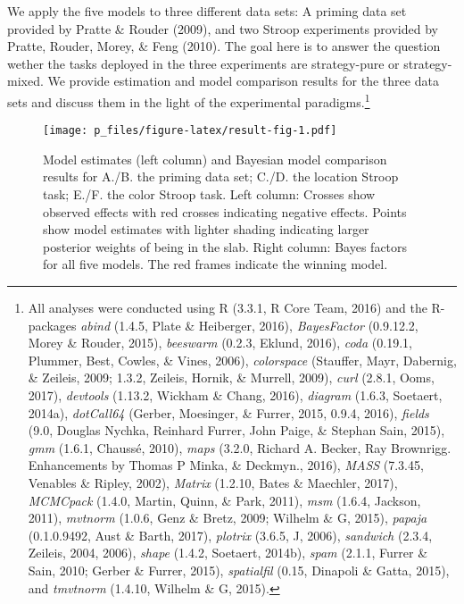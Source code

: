 \documentclass[english,man]{apa6}
\theoremstyle{definition}
\theoremstyle{definition}
\theoremstyle{remark}
\begin{document}
We apply the five models to three different data sets: A priming data
set provided by Pratte \& Rouder (2009), and two Stroop experiments
provided by Pratte, Rouder, Morey, \& Feng (2010). The goal here is to
answer the question wether the tasks deployed in the three experiments
are strategy-pure or strategy-mixed. We provide estimation and model
comparison results for the three data sets and discuss them in the light
of the experimental paradigms.\footnote{All analyses were conducted
  using R (3.3.1, R Core Team, 2016) and the R-packages \emph{abind}
  (1.4.5, Plate \& Heiberger, 2016), \emph{BayesFactor} (0.9.12.2, Morey
  \& Rouder, 2015), \emph{beeswarm} (0.2.3, Eklund, 2016), \emph{coda}
  (0.19.1, Plummer, Best, Cowles, \& Vines, 2006), \emph{colorspace}
  (Stauffer, Mayr, Dabernig, \& Zeileis, 2009; 1.3.2, Zeileis, Hornik,
  \& Murrell, 2009), \emph{curl} (2.8.1, Ooms, 2017), \emph{devtools}
  (1.13.2, Wickham \& Chang, 2016), \emph{diagram} (1.6.3, Soetaert,
  2014a), \emph{dotCall64} (Gerber, Moesinger, \& Furrer, 2015, 0.9.4,
  2016), \emph{fields} (9.0, Douglas Nychka, Reinhard Furrer, John
  Paige, \& Stephan Sain, 2015), \emph{gmm} (1.6.1, Chaussé, 2010),
  \emph{maps} (3.2.0, Richard A. Becker, Ray Brownrigg. Enhancements by
  Thomas P Minka, \& Deckmyn., 2016), \emph{MASS} (7.3.45, Venables \&
  Ripley, 2002), \emph{Matrix} (1.2.10, Bates \& Maechler, 2017),
  \emph{MCMCpack} (1.4.0, Martin, Quinn, \& Park, 2011), \emph{msm}
  (1.6.4, Jackson, 2011), \emph{mvtnorm} (1.0.6, Genz \& Bretz, 2009;
  Wilhelm \& G, 2015), \emph{papaja} (0.1.0.9492, Aust \& Barth, 2017),
  \emph{plotrix} (3.6.5, J, 2006), \emph{sandwich} (2.3.4, Zeileis,
  2004, 2006), \emph{shape} (1.4.2, Soetaert, 2014b), \emph{spam}
  (2.1.1, Furrer \& Sain, 2010; Gerber \& Furrer, 2015),
  \emph{spatialfil} (0.15, Dinapoli \& Gatta, 2015), and \emph{tmvtnorm}
  (1.4.10, Wilhelm \& G, 2015).}

\begin{figure}[htbp]
\centering
\texttt{[image: p\_files/figure-latex/result-fig-1.pdf]}
\caption{\label{fig:result-fig}Model estimates (left column) and Bayesian
model comparison results for A./B. the priming data set; C./D. the
location Stroop task; E./F. the color Stroop task. Left column: Crosses
show observed effects with red crosses indicating negative effects.
Points show model estimates with lighter shading indicating larger
posterior weights of being in the slab. Right column: Bayes factors for
all five models. The red frames indicate the winning model.}
\end{figure}
\end{document}
